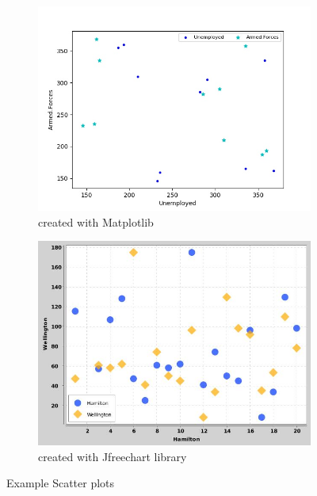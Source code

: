 \documentclass[12pt, a4paper,oneside]{report}
\begin{document}
\begin{figure}
	\begin{subfigure}{.5\textwidth}
		\centering
		\includegraphics[width=.8\linewidth]{scatter1}
		\caption{created with Matplotlib}
		\label{fig:sfig1}
	\end{subfigure}%
	\begin{subfigure}{.5\textwidth}
		\centering
		\includegraphics[width=.8\linewidth]{scatter2}
		\caption{created with Jfreechart library}
		\label{fig:sfig2}
	\end{subfigure}
	\caption{Example Scatter plots}
	\label{fig:fig}
\end{figure}
\end{document}
